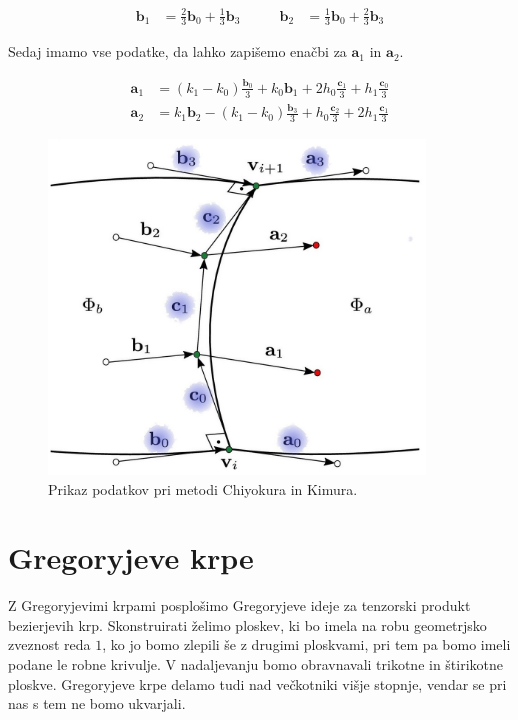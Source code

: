 \documentclass[a4paper,12pt]{article}
\newcommand{\tbf}{\textbf}
\begin{document}
	\begin{equation*}
		\begin{split}
			\tbf{b}_1 &= \frac{2}{3}\tbf{b}_0 + \frac{1}{3}\tbf{b}_3
		\end{split}
		\quad\quad
		\begin{split}
			\tbf{b}_2 &= \frac{1}{3}\tbf{b}_0 + \frac{2}{3}\tbf{b}_3
		\end{split}
	\end{equation*}

	Sedaj imamo vse podatke, da lahko zapišemo enačbi za $\textbf{a}_1$ in $\textbf{a}_2$.

	\begin{align*}
		\tbf{a}_1 &= (k_1 - k_0)\frac{\tbf{b}_0}{3} + k_0\tbf{b}_1 + 2h_0\frac{\tbf{c}_1}{3} + h_1\frac{\tbf{c}_0}{3} \\
		\tbf{a}_2 &= k_1\tbf{b}_2 - (k_1 - k_0)\frac{\tbf{b}_3}{3} + h_0\frac{\tbf{c}_2}{3} + 2h_1\frac{\tbf{c}_1}{3}
	\end{align*}

	\begin{figure}[h]
		\centering
		\includegraphics[width=10cm]{metoda_CinK_pobarvano.jpg}
		\caption{Prikaz podatkov pri metodi Chiyokura in Kimura.}
		\label{fig:chi_ki_metoda}
	\end{figure}


\section{Gregoryjeve krpe}
Z Gregoryjevimi krpami posplošimo Gregoryjeve ideje za tenzorski produkt bezierjevih krp.
Skonstruirati želimo ploskev, ki bo imela na robu geometrjsko zveznost reda $1$, ko jo bomo zlepili še z drugimi ploskvami, pri tem pa bomo imeli podane le robne krivulje. V nadaljevanju bomo obravnavali trikotne in štirikotne ploskve. Gregoryjeve krpe delamo tudi nad večkotniki višje stopnje, vendar se pri nas s tem ne bomo ukvarjali.
\end{document}
